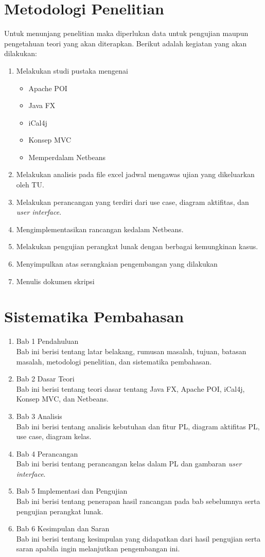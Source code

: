 \section{Metodologi Penelitian}
\label{sec:metodologi_penelitian}
Untuk menunjang penelitian maka diperlukan data untuk pengujian maupun pengetahuan teori yang akan diterapkan. Berikut adalah kegiatan yang akan dilakukan:
\begin{enumerate}
		\item Melakukan studi pustaka mengenai
			\begin{itemize}
				\item Apache POI
				\item Java FX
				\item iCal4j
				\item Konsep MVC
				\item Memperdalam Netbeans
			\end{itemize}
		\item Melakukan analisis pada file excel jadwal mengawas ujian yang dikeluarkan oleh TU.
		\item Melakukan perancangan yang terdiri dari use case, diagram aktifitas, dan \textit{user interface}.
		\item Mengimplementasikan rancangan kedalam Netbeans. 
		\item Melakukan pengujian perangkat lunak dengan berbagai kemungkinan kasus.
		\item Menyimpulkan atas serangkaian pengembangan yang dilakukan
		\item Menulis dokumen skripsi
	\end{enumerate}

\section{Sistematika Pembahasan}
\label{sec:sistematika_pembahasan}
\begin{enumerate}
	\item Bab 1 Pendahuluan\\
	Bab ini berisi tentang latar belakang, rumusan masalah, tujuan, batasan masalah, metodologi penelitian, dan sistematika pembahasan.
	\item Bab 2 Dasar Teori\\
	Bab ini berisi tentang teori dasar tentang Java FX, Apache POI, iCal4j, Konsep MVC, dan Netbeans.
	\item Bab 3 Analisis\\
	Bab ini berisi tentang analisis kebutuhan dan fitur PL, diagram aktifitas PL, use case, diagram kelas.
	\item Bab 4 Perancangan\\
	Bab ini berisi tentang perancangan kelas dalam PL dan gambaran \textit{user interface}.
	\item Bab 5 Implementasi dan Pengujian\\
	Bab ini berisi tentang penerapan hasil rancangan pada bab sebelumnya serta pengujian perangkat lunak.
	\item Bab 6 Kesimpulan dan Saran\\
	Bab ini berisi tentang kesimpulan yang didapatkan dari hasil pengujian serta saran apabila ingin melanjutkan pengembangan ini.
\end{enumerate}
